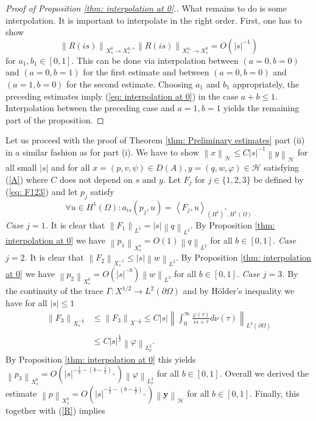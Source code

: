 \documentclass{amsart}
\newcommand{\abs}[1]{\left|#1\right|}
\newcommand{\norm}[1]{\left\| #1 \right\|}
\newcommand{\dual}[2]{\left\langle #1 , #2\right\rangle}
\newcommand{\ynice}{\mathbf{y}}
\newcommand{\Ho}{\mathcal{H}}
\begin{document}
\begin{proof}[Proof of Proposition \ref{thm: interpolation at 0}.]
 What remains to do is some interpolation. It is important to interpolate in the right order. First, one has to show 
 \begin{equation}\nonumber
  \norm{R(is)}_{X^0_s\rightarrow X^{b_1}_s}, \norm{R(is)}_{X^{a_1}_s\rightarrow X^0_s}=O(\abs{s}^{-1}) 
 \end{equation}
 for $a_1,b_1\in [0,1]$. This can be done via interpolation between $(a=0,b=0)$ and $(a=0, b=1)$ for the first estimate and between $(a=0,b=0)$ and $(a=1, b=0)$ for the second estimate. Choosing $a_1$ and $b_1$ appropriately, the preceding estimates imply (\ref{eq: interpolation at 0}) in the case $a+b\leq 1$. Interpolation between the preceding case and $a=1,b=1$ yields the remaining part of the proposition.  
\end{proof}
Let us proceed with the proof of Theorem \ref{thm: Preliminary estimates} part (ii) in a similar fashion as for part (i). We have to show $\norm{x}_{\Ho}\leq C\abs{s}^{-1} \norm{y}_{\Ho}$ for all small $\abs{s}$ and for all $x=(p,v,\psi)\in D(A), y=(q,w,\varphi)\in\Ho$ satisfying (\ref{A}) where $C$ does not depend on $s$ and $y$. Let $F_j$ for $j\in\{1,2,3\}$ be defined by (\ref{eq: F123}) and let $p_j$ satisfy
\begin{equation}\nonumber
 \forall u\in H^1(\Omega): a_{is}(p_j, u) = \dual{F_j}{u}_{(H^1)^*,H^1(\Omega)}
\end{equation}
\emph{Case $j=1$.} It is clear that $\norm{F_1}_{L^2}=\abs{s}\norm{q}_{L^2}$. By Proposition \ref{thm: interpolation at 0} we have $\norm{p_1}_{X^b_s}=O(1)\norm{q}_{L^2}$ for all $b\in[0,1]$.
\emph{Case $j=2$.} It is clear that $\norm{F_2}_{X^{-1}_s}\leq \abs{s}\norm{w}_{L^2}$. By Proposition \ref{thm: interpolation at 0} we have $\norm{p_2}_{X^b_s}=O(\abs{s}^{-b})\norm{w}_{L^2}$ for all $b\in[0,1]$.
\emph{Case $j=3$.} By the continuity of the trace $\Gamma:X^{1/2}\rightarrow L^2(\partial\Omega)$ and by H\"older's inequality we have for all $\abs{s}\leq 1$
\begin{align*}
 \norm{F_3}_{X^{-\frac{1}{2}}_s} &\leq \norm{F_3}_{X^{-\frac{1}{2}}} \leq  
   C \abs{s} \norm{\int_0^{\infty} \frac{\varphi(\tau)}{is+\tau} d\nu(\tau)}_{L^2(\partial\Omega)} \\
 &\leq C \abs{s}^{\frac{1}{2}} \norm{\varphi}_{L_{\nu}^2}.
\end{align*}
By Proposition \ref{thm: interpolation at 0} this yields $\norm{p_3}_{X^b_s}=O(\abs{s}^{-\frac{1}{2}-(b-\frac{1}{2})_+})\norm{\varphi}_{L_{\nu}^2}$ for all $b\in[0,1]$. Overall we derived the estimate $\norm{p}_{X^b_s}=O(\abs{s}^{-\frac{1}{2}-(b-\frac{1}{2})_+}) \norm{\ynice}_{\Ho}$ for all $b\in[0,1]$. Finally, this together with (\ref{R}) implies
\end{document}
